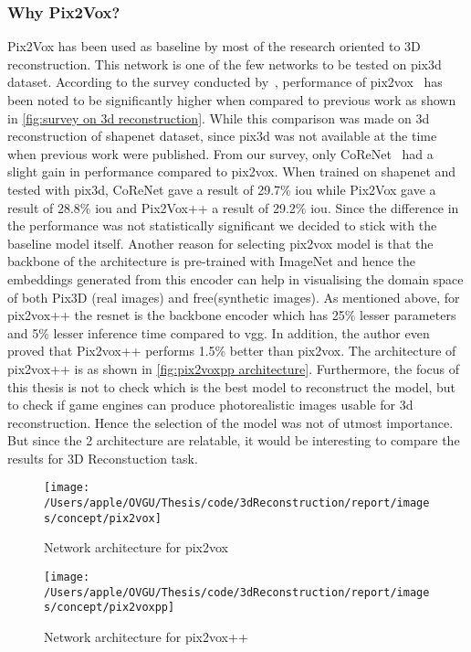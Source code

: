 \subsubsection{Why Pix2Vox?}
Pix2Vox has been used as baseline by most of the research oriented to 3D reconstruction.
This network is one of the few networks to be tested on pix3d dataset.
According to the survey conducted by~\cite{Han2021ImageBased3O}, performance of pix2vox~\cite{Xie_2019}
has been noted to be significantly higher when compared to previous work  as shown in \autoref{fig:survey on 3d reconstruction}.
While this comparison was made on 3d reconstruction of shapenet dataset, since pix3d was not available at the time when previous work were published.
From our survey, only CoReNet~\cite{popov2020corenet} had a slight gain in performance compared to pix2vox.
When trained on shapenet and tested with pix3d, CoReNet gave a result of 29.7\% \gls{iou} while Pix2Vox gave a result of 28.8\% \gls{iou}  and Pix2Vox++ a result of 29.2\% \gls{iou}\@.
Since the difference in the performance was not statistically significant we decided to stick with the baseline model itself.
Another reason for selecting pix2vox model is that the backbone of the architecture is pre-trained with ImageNet and
hence the embeddings generated from this encoder can help in visualising the domain space of both Pix3D (real images) and \gls{free}(synthetic images).
As mentioned above, for pix2vox++ the \gls{resnet} is the backbone encoder which has 25\% lesser parameters and 5\% lesser inference time compared to \gls{vgg}\@.
In addition, the author even proved that Pix2vox++ performs 1.5\% better than pix2vox.
The architecture of pix2vox++ is as shown in \autoref{fig:pix2voxpp architecture}.
Furthermore, the focus of this thesis is not to check which is the best model to reconstruct the model, but to check if game engines can produce photorealistic images usable for 3d reconstruction.
Hence the selection of the model was not of utmost importance.
But since the 2 architecture are relatable, it would be interesting to compare the results for 3D Reconstuction task.
\begin{figure}
    \centering
    \texttt{[image: /Users/apple/OVGU/Thesis/code/3dReconstruction/report/images/concept/pix2vox]}
    \caption{Network architecture for pix2vox~\cite{Xie_2019}}
    \label{fig:pix2vox architecture}
\end{figure}

\begin{figure}
    \centering
    \texttt{[image: /Users/apple/OVGU/Thesis/code/3dReconstruction/report/images/concept/pix2voxpp]}
    \caption{Network architecture for pix2vox++~\cite{Xie_2020}}
    \label{fig:pix2voxpp architecture}
\end{figure}

